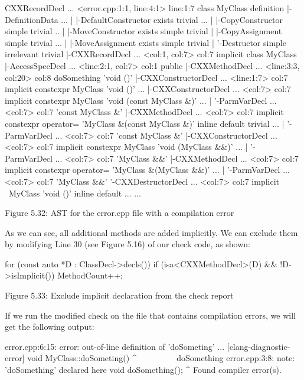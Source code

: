 \begin{shell}
CXXRecordDecl ... <error.cpp:1:1, line:4:1> line:1:7 class MyClass
definition
|-DefinitionData ...
| |-DefaultConstructor exists trivial ...
| |-CopyConstructor simple trivial ..
| |-MoveConstructor exists simple trivial
| |-CopyAssignment simple trivial ...
| |-MoveAssignment exists simple trivial
| '-Destructor simple irrelevant trivial
|-CXXRecordDecl ... <col:1, col:7> col:7 implicit class MyClass
|-AccessSpecDecl ... <line:2:1, col:7> col:1 public
|-CXXMethodDecl ... <line:3:3, col:20> col:8 doSomething 'void ()'
|-CXXConstructorDecl ... <line:1:7> col:7 implicit constexpr MyClass
'void ()' ...
|-CXXConstructorDecl ... <col:7> col:7 implicit constexpr MyClass
'void (const MyClass &)' ...
| '-ParmVarDecl ... <col:7> col:7 'const MyClass &'
|-CXXMethodDecl ... <col:7> col:7 implicit constexpr operator= 'MyClass
&(const MyClass &)' inline default trivial ...
| '-ParmVarDecl ... <col:7> col:7 'const MyClass &'
|-CXXConstructorDecl ... <col:7> col:7 implicit constexpr MyClass 'void
(MyClass &&)' ...
| '-ParmVarDecl ... <col:7> col:7 'MyClass &&'
|-CXXMethodDecl ... <col:7> col:7 implicit constexpr operator= 'MyClass
&(MyClass &&)' ...
| '-ParmVarDecl ... <col:7> col:7 'MyClass &&'
'-CXXDestructorDecl ... <col:7> col:7 implicit ~MyClass 'void ()' inline
default ...
...
\end{shell}

\begin{center}
Figure 5.32: AST for the error.cpp file with a compilation error
\end{center}

As we can see, all additional methods are added implicitly. We can exclude them by modifying Line 30 (see Figure 5.16) of our check code, as shown:

\begin{cpp}
for (const auto *D : ClassDecl->decls()) {
  if (isa<CXXMethodDecl>(D) && !D->isImplicit())
    MethodCount++;
}
\end{cpp}


\begin{center}
Figure 5.33: Exclude implicit declaration from the check report
\end{center}

If we run the modified check on the file that contains compilation errors, we will get the following output:

\begin{shell}
error.cpp:6:15: error: out-of-line definition of 'doSometing' ...
[clang-diagnostic-error]
void MyClass::doSometing() {}
              ^~~~~~~~~~
doSomething
error.cpp:3:8: note: 'doSomething' declared here
  void doSomething();
       ^
Found compiler error(s).
\end{shell}

